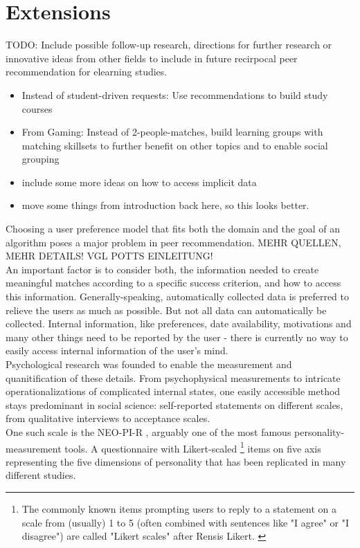 \documentclass[nochapterpage,bigchapter,linedtoc,longdoc,colorback,accentcolor=tud3b]{tudreport}
\begin{document}
\chapter{Extensions} \label{extensions}
TODO: Include possible follow-up research, directions for further research or innovative ideas from other fields to include in future recirpocal peer recommendation for elearning studies.\\
\begin{itemize}
	\item Instead of student-driven requests: Use recommendations to build study courses
	\item From Gaming: Instead of 2-people-matches, build learning groups with matching skillsets to further benefit on other topics and to enable social grouping\\
	\item include some more ideas on how to access implicit data
	\item move some things from introduction back here, so this looks better.
\end{itemize}
Choosing a user preference model that fits both the domain and the goal of an algorithm poses a major problem in peer recommendation. \cite{potts2018reciprocal, olakanmi2017group} MEHR QUELLEN, MEHR DETAILS! VGL POTTS EINLEITUNG!\\
An important factor is to consider both, the information needed to create meaningful matches according to a specific success criterion, and how to access this information. Generally-speaking, automatically collected data is preferred to relieve the users as much as possible. But not all data can automatically be collected. Internal information, like preferences, date availability, motivations and many other things need to be reported by the user - there is currently no way to easily access internal information of the user's mind.\\
Psychological research was founded to enable the measurement and quanitification of these details. From psychophysical measurements to intricate operationalizations of complicated internal states, one easily accessible method stays predominant in social science: self-reported statements on different scales, from qualitative interviews to acceptance scales.\\
One such scale is the NEO-PI-R \cite{ostendorf2004neo}, arguably one of the most famous personality-measurement tools. A questionnaire with Likert-scaled \footnote{The commonly known items prompting users to reply to a statement on a scale from (usually) 1 to 5 (often combined with sentences like "I agree" or "I disagree") are called "Likert scales" after Rensis Likert. \cite{likert1932technique}} items on five axis representing the five dimensions of personality that has been replicated in many different studies. \cite{mccrae1987validation, goldberg1990alternative}\\
\end{document}
